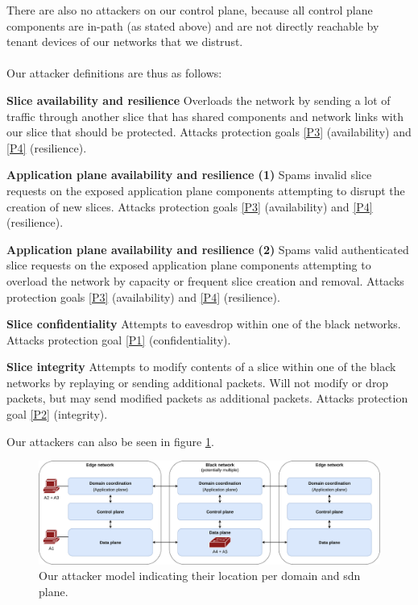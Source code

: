 There are also no attackers on our control plane, because all control plane components are in-path (as stated above) and are not directly reachable by tenant devices of our networks that we distrust.

\paragraph{} Our attacker definitions are thus as follows:
\begin{description}[style=multiline, labelwidth=0.7cm]
    \item[\namedlabel{A1}{A1}] \textbf{Slice availability and resilience} Overloads the network by sending a lot of traffic through another slice that has shared components and network links with our slice that should be protected. Attacks protection goals \ref{P3} (availability) and \ref{P4} (resilience).
    \item[\namedlabel{A2}{A2}] \textbf{Application plane availability and resilience (1)} Spams invalid slice requests on the exposed application plane components attempting to disrupt the creation of new slices. Attacks protection goals \ref{P3} (availability) and \ref{P4} (resilience).
    \item[\namedlabel{A3}{A3}] \textbf{Application plane availability and resilience (2)} Spams valid authenticated slice requests on the exposed application plane components attempting to overload the network by capacity or frequent slice creation and removal. Attacks protection goals \ref{P3} (availability) and \ref{P4} (resilience).
    \item[\namedlabel{A4}{A4}] \textbf{Slice confidentiality} Attempts to eavesdrop within one of the black networks. Attacks protection goal \ref{P1} (confidentiality).
    \item[\namedlabel{A5}{A5}] \textbf{Slice integrity} Attempts to modify contents of a slice within one of the black networks by replaying or sending additional packets. Will not modify or drop packets, but may send modified packets as additional packets. Attacks protection goal \ref{P2} (integrity).
\end{description}

Our attackers can also be seen in figure \ref{fig:attacker_model}.

\begin{landscape}
\begin{figure}[h]
  \centering
  \includegraphics[width=\linewidth]{images/chapter_4/attacker_model.png}
  \caption[Attacker model]{Our attacker model indicating their location per domain and \acrshort{sdn} plane.}
  \label{fig:attacker_model}
\end{figure}
\end{landscape}
